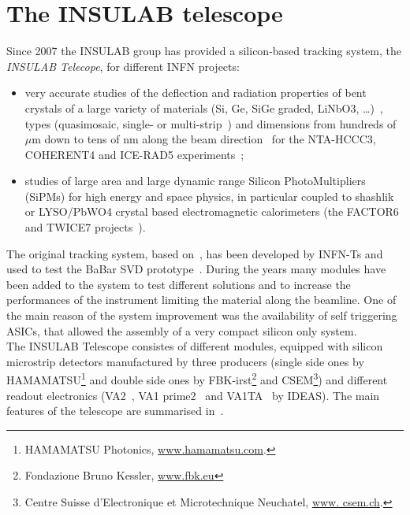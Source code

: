 \section{The INSULAB telescope}\label{sec:telescope}
Since 2007 the INSULAB group has provided a silicon-based tracking system, the
{\em INSULAB Telecope}, for different INFN projects:
\begin{itemize}
\item very accurate studies of the deflection and radiation properties of bent
  crystals of a large variety of materials (Si, Ge, SiGe graded, LiNbO3,
  \ldots)~\cite{bagli-coherent,desalvador-ge_crystals}, types (quasimosaic,
  single- or multi-strip~\cite{Hasan:1353904}) and dimensions from hundreds of $\mu$m
  down to tens of nm along the beam direction~\cite{Mazzolari2013130} for the NTA-HCCC3,
  COHERENT4 and ICE-RAD5 experiments~\cite{Hasan:1353904,Lietti201284};
\item studies of large area and large dynamic range Silicon PhotoMultipliers
  (SiPMs) for high energy and space physics, in particular coupled to shashlik
  or LYSO/PbWO4 crystal based electromagnetic calorimeters (the FACTOR6 and
  TWICE7 projects~\cite{Berra:1458946,Berra2013380,guffanti-LYSO}).
\end{itemize}
The original tracking system, based on~\cite{Celano199649}, has been developed
by INFN-Ts and used to test the BaBar SVD
prototype~\cite{bari1996results}. During the years many modules have been added
to the system to test different solutions and to increase the performances of
the instrument limiting the material along the beamline. One of the main reason
of the system improvement was the availability of self triggering ASICs, that
allowed the assembly of a very compact silicon only system.\\
The INSULAB Telescope consistes of different modules, equipped with silicon
microstrip detectors manufactured by three producers (single side ones by
HAMAMATSU\footnote{HAMAMATSU Photonics, \url{www.hamamatsu.com}.} and double
side ones by FBK-irst\footnote{Fondazione Bruno Kessler, \url{www.fbk.eu}} and
CSEM\footnote{Centre Suisse d'Electronique et Microtechnique Neuchatel, \url{www.
csem.ch}.}) and different readout electronics (VA2~\cite{va2_spec},
VA1 prime2~\cite{va1prime_spec} and VA1TA~\cite{va1ta_spec} by IDEAS). The main
features of the telescope are summarised in~.
